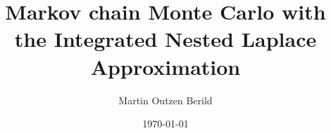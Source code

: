 \documentclass{report}
\title{\color{astral}Markov chain Monte Carlo with the Integrated Nested Laplace Approximation}
\author{\color{astral}Martin Outzen Berild}
\date{\color{astral} \today}
\begin{document}
    \maketitle
	
	
	
    \tableofcontents
    \newpage
    \cite{gomez-rubio_estimating_2017}
    
    
    
    
    
    
    \printbibliography
    
\end{document}
